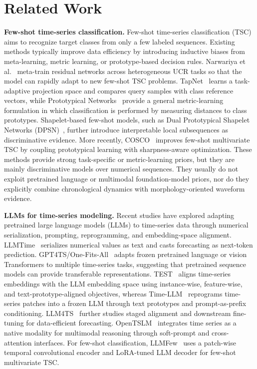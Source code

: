 \documentclass[10pt,journal,compsoc]{IEEEtran}
\begin{document}
\section{Related Work}
\noindent\textbf{Few-shot time-series classification.}
Few-shot time-series classification (TSC) aims to recognize target classes from only a few labeled sequences. Existing methods typically improve data efficiency by introducing inductive biases from meta-learning, metric learning, or prototype-based decision rules. Narwariya et al.~\cite{narwariya2020meta} meta-train residual networks across heterogeneous UCR tasks so that the model can rapidly adapt to new few-shot TSC problems. TapNet~\cite{yoon2019tapnet} learns a task-adaptive projection space and compares query samples with class reference vectors, while Prototypical Networks~\cite{snell2017prototypical} provide a general metric-learning formulation in which classification is performed by measuring distances to class prototypes. Shapelet-based few-shot models, such as Dual Prototypical Shapelet Networks (DPSN)~\cite{tang2020dpsn}, further introduce interpretable local subsequences as discriminative evidence. More recently, COSCO~\cite{barreda2024cosco} improves few-shot multivariate TSC by coupling prototypical learning with sharpness-aware optimization. These methods provide strong task-specific or metric-learning priors, but they are mainly discriminative models over numerical sequences. They usually do not exploit pretrained language or multimodal foundation-model priors, nor do they explicitly combine chronological dynamics with morphology-oriented waveform evidence.

\noindent\textbf{LLMs for time-series modeling.}
Recent studies have explored adapting pretrained large language models (LLMs) to time-series data through numerical serialization, prompting, reprogramming, and embedding-space alignment. LLMTime~\cite{gruver2023llmtime} serializes numerical values as text and casts forecasting as next-token prediction. GPT4TS/One-Fits-All~\cite{zhou2023onefitsall} adapts frozen pretrained language or vision Transformers to multiple time-series tasks, suggesting that pretrained sequence models can provide transferable representations. TEST~\cite{sun2024test} aligns time-series embeddings with the LLM embedding space using instance-wise, feature-wise, and text-prototype-aligned objectives, whereas Time-LLM~\cite{jin2024timellm} reprograms time-series patches into a frozen LLM through text prototypes and prompt-as-prefix conditioning. LLM4TS~\cite{chang2025llm4ts} further studies staged alignment and downstream fine-tuning for data-efficient forecasting. OpenTSLM~\cite{langer2025opentslm} integrates time series as a native modality for multimodal reasoning through soft-prompt and cross-attention interfaces. For few-shot classification, LLMFew~\cite{chen2025llmfew} uses a patch-wise temporal convolutional encoder and LoRA-tuned LLM decoder for few-shot multivariate TSC.
\end{document}
